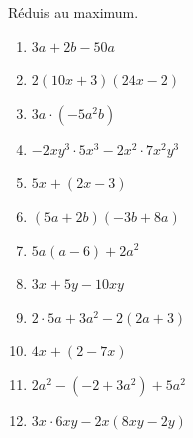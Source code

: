 %
%
    Réduis au maximum.
    \begin{enumerate}[cols=2]
        \item $3a + 2b - 50a$
        \item $2(10x+3)(24x-2)$
        \item $3a \cdot (-5a^2b)$
        \item $-2xy^3 \cdot 5x^3 - 2x^2 \cdot 7x^2y^3$
        \item $5x+(2x-3)$
        \item $(5a+2b)(-3b+8a)$
        \item $5a(a-6) + 2a^2$
        \item $3x+5y-10xy$
        \item \(2\cdot 5a + 3a^2 - 2(2a+3)\)
        \item \(4x + (2 - 7x)  \)
        \item \(2a^2 - (-2 + 3a^2) + 5a^2 \)
        \item \(3x \cdot 6xy - 2x (8xy - 2y)\)
    \end{enumerate}
